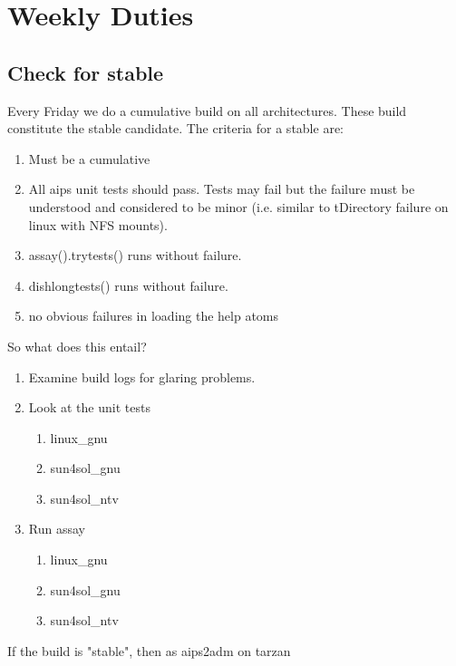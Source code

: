 \chapter{Weekly Duties}
\section{Check for stable}
Every Friday we do a cumulative build on all architectures.  These build constitute the stable
candidate.  The criteria for a stable are:
\begin{enumerate}
\item Must be a cumulative
\item All aips unit tests should pass. Tests may fail but the failure must be understood and
considered to be minor (i.e. similar to tDirectory failure on linux with NFS mounts).
\item assay().trytests() runs without failure.
\item dishlongtests() runs without failure.
\item no obvious failures in loading the help atoms
\end{enumerate}
So what does this entail?
\begin{enumerate}
\item Examine build logs for glaring problems. 
\item Look at the unit tests
\begin{enumerate}
\item{linux\_gnu}
\item{sun4sol\_gnu}
\item{sun4sol\_ntv}
\end{enumerate}
\item Run assay
\begin{enumerate}
\item{linux\_gnu}
\item{sun4sol\_gnu}
\item{sun4sol\_ntv}
\end{enumerate}
\end{enumerate}
If the build is "stable", then as aips2adm on tarzan
